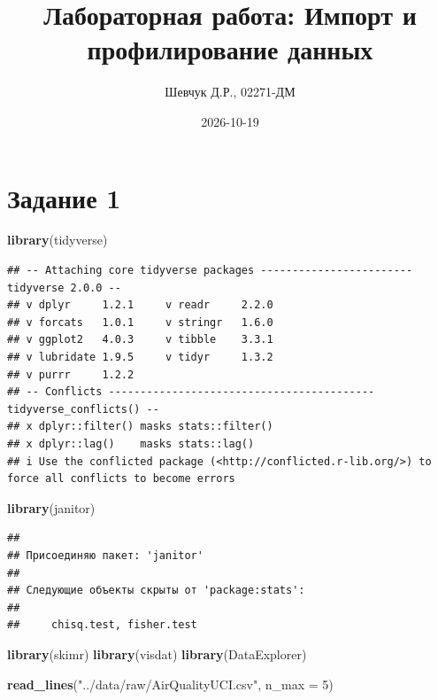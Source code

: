 \documentclass[
]{article}
\title{Лабораторная работа: Импорт и профилирование данных}
\author{Шевчук Д.Р., 02271-ДМ}
\date{2026-10-19}
\newenvironment{Shaded}{\begin{snugshade}}{\end{snugshade}}
\newcommand{\AttributeTok}[1]{\textcolor[rgb]{0.13,0.29,0.53}{#1}}
\newcommand{\DecValTok}[1]{\textcolor[rgb]{0.00,0.00,0.81}{#1}}
\newcommand{\FunctionTok}[1]{\textcolor[rgb]{0.13,0.29,0.53}{\textbf{#1}}}
\newcommand{\NormalTok}[1]{#1}
\newcommand{\StringTok}[1]{\textcolor[rgb]{0.31,0.60,0.02}{#1}}
\begin{document}
\maketitle

{
\setcounter{tocdepth}{2}
\tableofcontents
}
\section{Задание 1}\label{ux437ux430ux434ux430ux43dux438ux435-1}

\begin{Shaded}
\begin{Highlighting}[]
\FunctionTok{library}\NormalTok{(tidyverse)}
\end{Highlighting}
\end{Shaded}

\begin{verbatim}
## -- Attaching core tidyverse packages ------------------------ tidyverse 2.0.0 --
## v dplyr     1.2.1     v readr     2.2.0
## v forcats   1.0.1     v stringr   1.6.0
## v ggplot2   4.0.3     v tibble    3.3.1
## v lubridate 1.9.5     v tidyr     1.3.2
## v purrr     1.2.2     
## -- Conflicts ------------------------------------------ tidyverse_conflicts() --
## x dplyr::filter() masks stats::filter()
## x dplyr::lag()    masks stats::lag()
## i Use the conflicted package (<http://conflicted.r-lib.org/>) to force all conflicts to become errors
\end{verbatim}

\begin{Shaded}
\begin{Highlighting}[]
\FunctionTok{library}\NormalTok{(janitor)}
\end{Highlighting}
\end{Shaded}

\begin{verbatim}
## 
## Присоединяю пакет: 'janitor'
## 
## Следующие объекты скрыты от 'package:stats':
## 
##     chisq.test, fisher.test
\end{verbatim}

\begin{Shaded}
\begin{Highlighting}[]
\FunctionTok{library}\NormalTok{(skimr)}
\FunctionTok{library}\NormalTok{(visdat)}
\FunctionTok{library}\NormalTok{(DataExplorer)}
\end{Highlighting}
\end{Shaded}

\begin{Shaded}
\begin{Highlighting}[]
\FunctionTok{read\_lines}\NormalTok{(}\StringTok{"../data/raw/AirQualityUCI.csv"}\NormalTok{, }\AttributeTok{n\_max =} \DecValTok{5}\NormalTok{)}
\end{Highlighting}
\end{Shaded}
\end{document}
